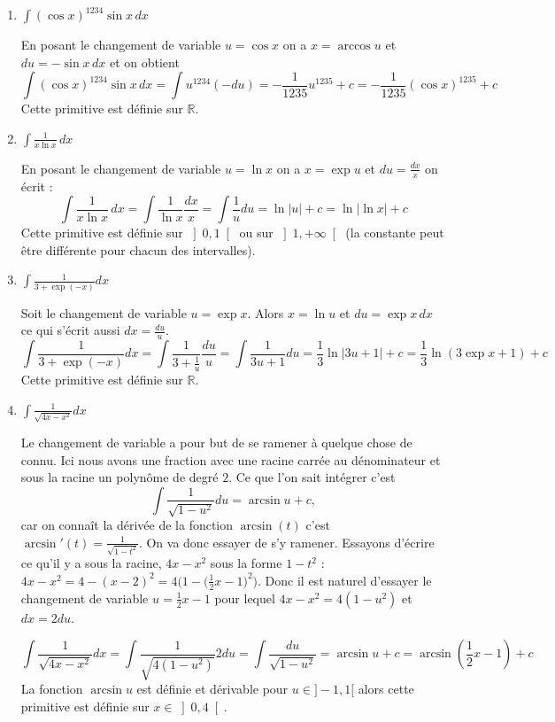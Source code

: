 \documentclass[11pt,a4paper]{article}
\newcommand{\Rr}{\mathbb{R}} \newcommand{\R}{\mathbb{R}}
\begin{document}
\begin{enumerate}
  \item $\int (\cos x) ^{1234} \sin x \, d x$

En posant le changement de variable $u = \cos x$ on a $x=\arccos u$ et $du = - \sin x \, dx$ et 
on obtient 
$$\int (\cos x) ^{1234} \sin x \, d x = \int u^{1234} (-du) = - \frac 1{1235} u^{1235} + c=  -\frac 1{1235}(\cos x)^{1235}+c$$
Cette primitive est définie sur $\Rr$.

  \item $\int \frac 1{x\ln x} \, dx$

En posant le changement de variable $u=\ln x$ on a $x=\exp u$ et $du = \frac {dx}{x}$ on écrit :
$$\int \frac 1{x\ln x} \, dx = \int \frac 1{\ln x} \frac{dx}{x} = \int \frac 1 u du= \ln |u| + c = \ln \left| \ln x\right| +c$$
Cette primitive est définie sur $\left] 0,1\right[$ ou sur $\left] 1,+\infty \right[$ (la constante peut être différente pour chacun des intervalles).


  \item $\int \frac 1{3+\exp \left( -x\right)}dx$

Soit le changement de variable $u=\exp x$. Alors $x=\ln u$ et $du = \exp x \, dx$
ce qui s'écrit aussi $dx = \frac{du}{u}$.
$$\int \frac 1{3+\exp \left( -x\right) }dx = \int \frac{1}{3+\frac{1}{u}} \frac{du}{u}
= \int \frac{1}{3u+1} du = \frac 13 \ln |3u+1| + c = \frac13\ln \left( 3\exp
x+1\right) +c$$
Cette primitive est définie sur $\Rr$.

  \item $\int \frac{1}{\sqrt{4x-x^2}}dx$

Le changement de variable a pour but de se ramener à quelque chose de connu.
Ici nous avons une fraction avec une racine carrée au dénominateur et sous la racine un polynôme de degré $2$.
Ce que l'on sait intégrer c'est
$$\int \frac{1}{\sqrt{1-u^2}}du = \arcsin u + c,$$
car on connaît la dérivée de la fonction $\arcsin(t)$ c'est $\arcsin'(t)=\frac{1}{\sqrt{1-t^2}}$.
On va donc essayer de s'y ramener.
Essayons d'écrire ce qu'il y a sous la racine, $4x-x^2$ sous la forme $1-t^2$ :
$4x-x^2 =  4 - (x-2)^2 = 4 \bigg( 1 - \big(\frac 12 x - 1\big)^2\bigg)$.
Donc il est naturel d'essayer le changement de variable $u= \frac 12 x - 1$
pour lequel $4x-x^2=4(1-u^2)$ et $dx = 2du$. 

$$\int \frac{1}{\sqrt{4x-x^2}}dx = \int \frac{1}{\sqrt{4(1-u^2)}} 2du = \int \frac{du}{\sqrt{1-u^2}}
= \arcsin u + c = \arcsin \left( \frac 12x-1\right) +c$$
La fonction $\arcsin u$ est définie et dérivable pour $u\in]-1,1[$ alors cette primitive est 
définie sur $x \in \left] 0,4\right[$.
\end{enumerate}
\end{document}
